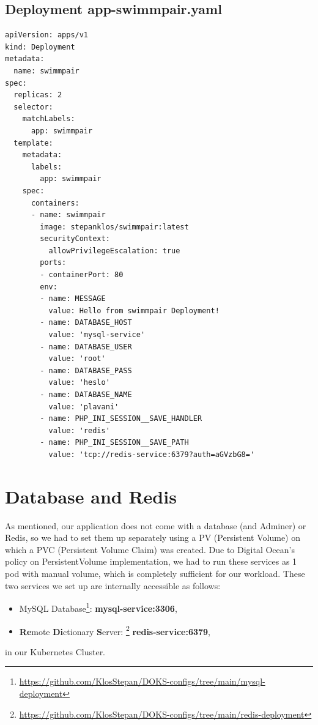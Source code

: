 \subsection*{Deployment app-swimmpair.yaml}
\begin{lstlisting}
apiVersion: apps/v1
kind: Deployment
metadata:
  name: swimmpair
spec:
  replicas: 2
  selector:
    matchLabels:
      app: swimmpair
  template:
    metadata:
      labels:
        app: swimmpair
    spec:
      containers:
      - name: swimmpair
        image: stepanklos/swimmpair:latest
        securityContext:
          allowPrivilegeEscalation: true
        ports:
        - containerPort: 80
        env:
        - name: MESSAGE
          value: Hello from swimmpair Deployment!
        - name: DATABASE_HOST
          value: 'mysql-service'
        - name: DATABASE_USER
          value: 'root'
        - name: DATABASE_PASS
          value: 'heslo'
        - name: DATABASE_NAME
          value: 'plavani' 
        - name: PHP_INI_SESSION__SAVE_HANDLER
          value: 'redis'
        - name: PHP_INI_SESSION__SAVE_PATH
          value: 'tcp://redis-service:6379?auth=aGVzbG8='
\end{lstlisting}    
\section*{Database and Redis}
As mentioned, our application does not come with a database (and Adminer) or Redis, so we had to set them up separately using a PV (Persistent Volume) on which a PVC (Persistent Volume Claim) was created. Due to Digital Ocean's policy on PersistentVolume implementation, we had to run these services as 1 pod with manual volume, which is completely sufficient for our workload.
\newline
These two services we set up are internally accessible as follows:
\begin{itemize}
    \item MySQL Database\footnote{\url{https://github.com/KlosStepan/DOKS-configs/tree/main/mysql-deployment}}: \textbf{mysql-service:3306},
    \item \textbf{Re}mote \textbf{Di}ctionary \textbf{S}erver: \footnote{\url{https://github.com/KlosStepan/DOKS-configs/tree/main/redis-deployment}} \textbf{redis-service:6379},
\end{itemize}
in our Kubernetes Cluster.
